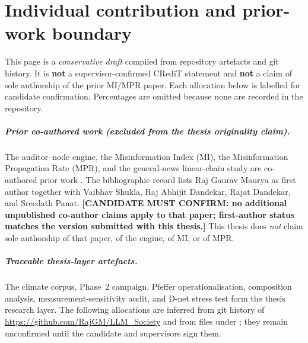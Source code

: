 \documentclass[
  11pt,a4paper,twoside,openright,
  bibliography=totoc,listof=totoc,
  captions=tableheading,headings=normal,numbers=noenddot
]{scrbook}
\begin{document}
\chapter*{Individual contribution and prior-work boundary}
This page is a \emph{conservative draft} compiled from repository artefacts
and git history.
It is \textbf{not} a supervisor-confirmed CRediT statement and \textbf{not}
a claim of sole authorship of the prior MI/MPR paper.
Each allocation below is labelled for candidate confirmation.
Percentages are omitted because none are recorded in the repository.

\paragraph{Prior co-authored work (excluded from the thesis originality claim).}
The auditor--node engine, the Misinformation Index (MI), the Misinformation
Propagation Rate (MPR), and the general-news linear-chain study are
co-authored prior work \parencite{maurya2025simulating}.
The bibliographic record lists Raj Gaurav Maurya as first author together
with Vaibhav Shukla, Raj Abhijit Dandekar, Rajat Dandekar, and Sreedath Panat.
\textbf{[CANDIDATE MUST CONFIRM: no additional unpublished co-author claims
apply to that paper; first-author status matches the version submitted with
this thesis.]}
This thesis does \emph{not} claim sole authorship of that paper, of the
engine, of MI, or of MPR.

\paragraph{Traceable thesis-layer artefacts.}
The climate corpus, Phase~2 campaign, Pfeffer operationalisation, composition
analysis, measurement-sensitivity audit, and D-net stress test form the
thesis research layer.
The following allocations are inferred from git history of
\url{https://github.com/RajGM/LLM_Society} and from files under
; they remain unconfirmed until the candidate and
supervisors sign them.
\end{document}
